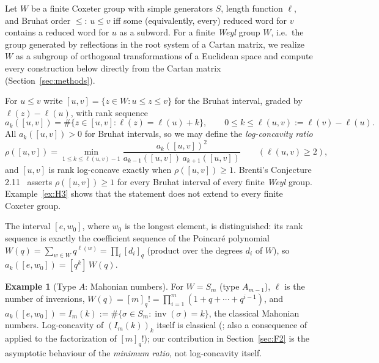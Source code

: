 \documentclass[11pt]{amsart}
\theoremstyle{plain}
\theoremstyle{definition}
\newtheorem{example}[theorem]{Example}
\theoremstyle{remark}
\newcommand{\W}{W}
\DeclareMathOperator{\inv}{inv}
\begin{document}
Let $\W$ be a finite Coxeter group with simple generators $S$, length
function $\ell$, and Bruhat order $\le$: $u\le v$ iff some (equivalently,
every) reduced word for $v$ contains a reduced word for $u$ as a subword.
For a finite \emph{Weyl} group $\W$, i.e.\ the group generated by
reflections in the root system of a Cartan matrix, we realize $\W$ as a
subgroup of orthogonal transformations of a Euclidean space and compute
every construction below directly from the Cartan matrix
(Section~\ref{sec:methods}).

For $u\le v$ write $[u,v]=\{z\in \W : u\le z\le v\}$ for the Bruhat interval,
graded by $\ell(z)-\ell(u)$, with rank sequence
\[
a_k([u,v]) = \#\{z\in [u,v] : \ell(z)=\ell(u)+k\}, \qquad 0\le k \le
\ell(u,v):=\ell(v)-\ell(u).
\]
All $a_k([u,v])>0$ for Bruhat intervals, so we may define the
\emph{log-concavity ratio}
\[
\rho([u,v]) = \min_{1\le k\le \ell(u,v)-1} \frac{a_k([u,v])^2}{a_{k-1}([u,v])\,
a_{k+1}([u,v])} \qquad (\ell(u,v)\ge 2),
\]
and $[u,v]$ is rank log-concave exactly when $\rho([u,v])\ge 1$. Brenti's Conjecture 2.11~\cite{brenti2024open} asserts
$\rho([u,v])\ge 1$ for every Bruhat interval of every finite \emph{Weyl}
group. Example~\ref{ex:H3} shows that the statement does not extend to
every finite Coxeter group.

The interval $[e,w_0]$, where $w_0$ is the longest element, is distinguished:
its rank sequence is exactly the coefficient sequence of the Poincar\'e
polynomial $W(q) = \sum_{w\in \W} q^{\ell(w)} = \prod_{i} [d_i]_q$ (product
over the degrees $d_i$ of $\W$), so $a_k([e,w_0]) = [q^k]\,W(q)$.

\begin{example}[Type $A$: Mahonian numbers]
For $\W=S_m$ (type $A_{m-1}$), $\ell$ is the number of inversions,
$W(q)=[m]_q! = \prod_{i=1}^m (1+q+\cdots+q^{i-1})$, and $a_k([e,w_0]) =
I_m(k) := \#\{\sigma\in S_m : \inv(\sigma)=k\}$, the classical Mahonian
numbers. Log-concavity of $(I_m(k))_k$ itself is classical
(\cite{bona2004}; also a consequence of~\cite{hoggar1974,kook2006} applied to
the factorization of $[m]_q!$); our contribution in Section~\ref{sec:F2} is
the asymptotic behaviour of the \emph{minimum ratio}, not log-concavity
itself.
\end{example}
\end{document}
